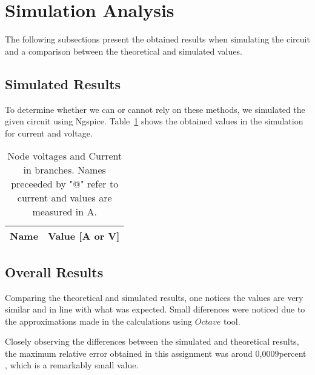 \section{Simulation Analysis}
\label{sec:simulation}

The following subsections present the obtained results when simulating the circuit and a comparison between the theoretical and simulated values.

\subsection{Simulated Results}

To determine whether we can or cannot rely on these methods, we simulated the given circuit using Ngspice. Table~\ref{tab:sr}  shows the obtained values in the simulation for current and voltage.

\begin{table}[h]
  \centering
  \begin{tabular}{|l|r|}
    \hline    
    {\bf Name} & {\bf Value [A or V]} \\ \hline
    
  \end{tabular}
  \caption{Node voltages and Current in branches. Names preceeded by "@" refer to current and values are measured in A.}
  \label{tab:sr}
\end{table}


\subsection{Overall Results}

Comparing the theoretical and simulated results, one notices the values are very similar and in line with what was expected. Small diferences were noticed due to the approximations made in the calculations using $Octave$ tool.

Closely observing the differences between the simulated and theoretical results, the maximum relative error obtained in this assignment was aroud 0,0009percent , which is a remarkably small value.

\vspace{10cm}
